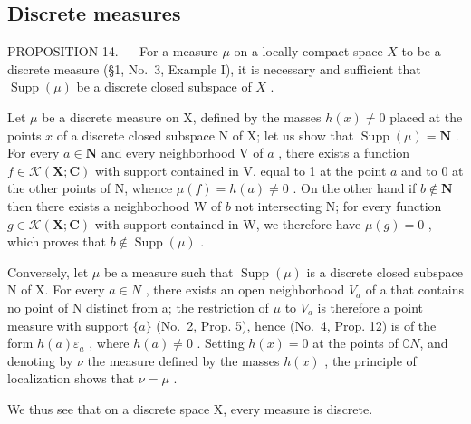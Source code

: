 \subsection{Discrete measures}

PROPOSITION 14. --- For a measure \(\mu\) on a locally compact space \(X\) to be a discrete measure (§1, No.~3, Example I), it is necessary and sufficient that \(\operatorname{Supp}(\mu)\) be a discrete closed subspace of \(X\) .

Let \(\mu\) be a discrete measure on X, defined by the masses \(h(x) \neq 0\) placed at the points \(x\) of a discrete closed subspace N of X; let us show that \(\operatorname{Supp}(\mu) = \mathbf{N}\) . For every \(a \in \mathbf{N}\) and every neighborhood V of \(a\) , there exists a function \(f \in \mathcal{K}(\mathbf{X}; \mathbf{C})\) with support contained in V, equal to 1 at the point \(a\) and to 0 at the other points of N, whence \(\mu(f) = h(a) \neq 0\) . On the other hand if \(b \notin \mathbf{N}\) then there exists a neighborhood W of \(b\) not intersecting N; for every function \(g \in \mathcal{K}(\mathbf{X}; \mathbf{C})\) with support contained in W, we therefore have \(\mu(g) = 0\) , which proves that \(b \notin \operatorname{Supp}(\mu)\) .

Conversely, let \(\mu\) be a measure such that \(\operatorname{Supp}(\mu)\) is a discrete closed subspace N of X. For every \(a \in N\) , there exists an open neighborhood \(V_{a}\) of a that contains no point of N distinct from a; the restriction of \(\mu\) to \(V_{a}\) is therefore a point measure with support \(\{a\}\) (No.~2, Prop. 5), hence (No.~4, Prop. 12) is of the form \(h(a)\varepsilon_{a}\) , where \(h(a)\neq0\) . Setting \(h(x)=0\) at the points of \(\complement N\), and denoting by \(\nu\) the measure defined by the masses \(h(x)\) , the principle of localization shows that \(\nu=\mu\) .

We thus see that on a discrete space X, every measure is discrete.

